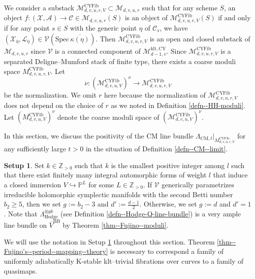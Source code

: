 \documentclass[12pt,twoside]{amsart}
\theoremstyle{definition}
\newtheorem{setup}[thm]{Setup}
\begin{document}
We consider a substack $\mathcal{M}_{d,v,u,r,V}^{\mathrm{CYFib}}\subset \mathcal{M}_{d,v,u,r}$ such that for any scheme $S$, an object  $f\colon(\mathcal{X},\mathcal{A})\to \mathcal{C}\in\mathcal{M}_{d,v,u,r}(S)$ is an object of $\mathcal{M}_{d,v,u,r,V}^{\mathrm{CYFib}}(S)$ if and only if for any point $s\in S$ with the generic point $\eta$ of $\mathcal{C}_s$, we have $(\mathcal{X}_{\overline{\eta}},\mathcal{L}_{\overline{\eta}})\in\mathcal{V}(\mathrm{Spec}\,\overline{\kappa(\eta)})$. 
Then $\mathcal{M}_{d,v,u,r,V}^{\mathrm{CYFib}}$ is an open and closed substack of $\mathcal{M}_{d,v,u,r}$ since $\mathcal{V}$ is a connected component of $\mathcal{M}_{d-1,v}^{\mathrm{klt,CY}}$. 
Since $\mathcal{M}_{d,v,u,r,V}^{\mathrm{CYFib}}$ is a separated Deligne--Mumford stack of finite type, there exists a coarse moduli space $M_{d,v,u,r,V}^{\mathrm{CYFib}}$. 
Let  \[\nu\colon(\mathcal{M}_{d,v,u,V}^{\mathrm{CYFib}})^{\nu}\to\mathcal{M}_{d,v,u,r,V}^{\mathrm{CYFib}}\] be the normalization.
We omit $r$ here because the normalization of $\mathcal{M}_{d,v,u,r,V}^{\mathrm{CYFib}}$ does not depend on the choice of $r$ as we noted in Definition \ref{defn--HH-moduli}.
Let $(M_{d,v,u,V}^{\mathrm{CYFib}})^{\nu}$ denote the coarse moduli space of $(\mathcal{M}_{d,v,u,V}^{\mathrm{CYFib}})^{\nu}$.

In this section, we discuss the positivity of the CM line bundle $\Lambda_{\mathrm{CM},t}|_{M_{d,v,u,r,V}^{\mathrm{CYFib}}}$ for any sufficiently large $t>0$ in the situation of Definition \ref{defn--CM--limit}.



\begin{setup}\label{ass--Hodge--compactification}
Set $k\in\mathbb{Z}_{>0}$ such that $k$ is the smallest positive integer among $l$ such that there exist finitely many integral automorphic forms of weight $l$ that induce a closed immersion $V\hookrightarrow \mathbb{P}^{L}$ for some $L\in\mathbb{Z}_{>0}$.
If $\mathcal{V}$ generically parametrizes irreducible holomorphic symplectic manifolds with the second Betti number $b_2\ge5$, then we set $g:=b_2-3$ and $d':=\frac{d-1}{2}$.
Otherwise, we set $g:=d$ and $d'=1$.
Note that $\Lambda_{\mathrm{Hodge}}^{\otimes gk}$ (see Definition \ref{defn--Hodge-Q-line-bundle}) is a very ample line bundle on $\overline{V}^{\mathrm{BB}}$ by Theorem \ref{thm--Fujino--moduli}. 
  \end{setup}
  
  We will use the notation in Setup \ref{ass--Hodge--compactification} throughout this section.
  Theorem \ref{thm--Fujino's--period--mapping--theory} is necessary to correspond a family of uniformly adiabatically K-stable klt--trivial fibrations over curves to a family of quasimaps. 
\end{document}

